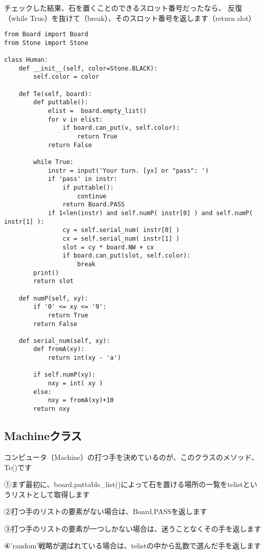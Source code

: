 \documentclass[uplatex,a4paper,11pt,oneside,openany]{jsbook}
\begin{document}
チェックした結果、石を置くことのできるスロット番号だったなら、
反復（while True）を抜けて（break）、そのスロット番号を返します（return slot）

\begin{lstlisting}[caption=Human class,label=othello03]
from Board import Board
from Stone import Stone

class Human:
    def __init__(self, color=Stone.BLACK):
        self.color = color

    def Te(self, board):
        def puttable():
            elist =  board.empty_list()
            for v in elist:
                if board.can_put(v, self.color):
                    return True
            return False

        while True:
            instr = input('Your turn. [yx] or "pass": ')
            if 'pass' in instr:
                if puttable():
                    continue
                return Board.PASS
            if 1<len(instr) and self.numP( instr[0] ) and self.numP( instr[1] ):
                cy = self.serial_num( instr[0] )
                cx = self.serial_num( instr[1] )
                slot = cy * board.NW + cx
                if board.can_put(slot, self.color):
                    break
        print()
        return slot

    def numP(self, xy):
        if '0' <= xy <= '9':
            return True
        return False

    def serial_num(self, xy):
        def fromA(xy):
            return int(xy - 'a')

        if self.numP(xy):
            nxy = int( xy )
        else:
            nxy = fromA(xy)+10
        return nxy
\end{lstlisting}

\subsection{Machineクラス}

コンピュータ（Machine）の打つ手を決めているのが、このクラスのメソッド、Te()です

①まず最初に、board.puttable\_list()によって石を置ける場所の一覧をtelistというリストとして取得します

②打つ手のリストの要素がない場合は、Board.PASSを返します

③打つ手のリストの要素が一つしかない場合は、迷うことなくその手を返します

④'random'戦略が選ばれている場合は、telistの中から乱数で選んだ手を返します
\end{document}
